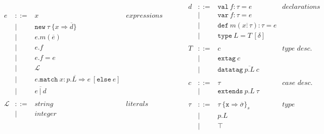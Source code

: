 \documentclass{article}
\newcommand{\keywadj}[1]{\mathtt{#1}}
\newcommand{\keyw}[1]{\keywadj{#1}~}
\begin{document}
\[\begin{array}{lll}
\begin{array}{lllr}
e & ::= & x                                                              & expressions \\
  & |   & \keywadj{new}~\tau~\{x \Rightarrow \overline{d}\}              &\\
  & |   & e.m(\overline{e})                                              &\\
  & |   & e.f                                                            &\\
  & |   & e.f = e                                                        &\\
  & |   & \mathscr{L}                                                    &\\
  & |   & e.\keyw{match} \overline{x:p.L \Rightarrow e} ~[\keyw{else} e] &\\
  & |   & \overline{e ~| ~d}                                             &\\
&&\\
\mathscr{L} & ::= & string & literals \\
& | & integer &\\
&&\\
\end{array}
& ~~~~~~
&
\begin{array}{lllr}
d & ::= & \keyw{val} f : \tau = e                    & declarations \\
  & |   & \keyw{var} f : \tau = e                    &\\
  & |   & \keyw{def} m(\overline{x:\tau}) : \tau = e &\\
  & |   & \keyw{type} L = T ~[\delta]                 &\\
&&\\
T & ::= & c                                & \textit{type desc.}\\
  & |   & \keyw{extag} c                   &\\
  & |   & \keyw{datatag} \overline{p.L} ~c &\\
&&\\
c & ::= & \tau                    & \textit{case desc.} \\
  & |   & \keyw{extends} p.L~\tau &\\
&&\\
\tau & ::= & \tau~\{\texttt{x} \Rightarrow \overline{\sigma}\}_{s} & type \\
     & |   & p.L                                                   &\\
     & |   & \top                                                  &\\

\end{array}
\end{array}\]
\end{document}
